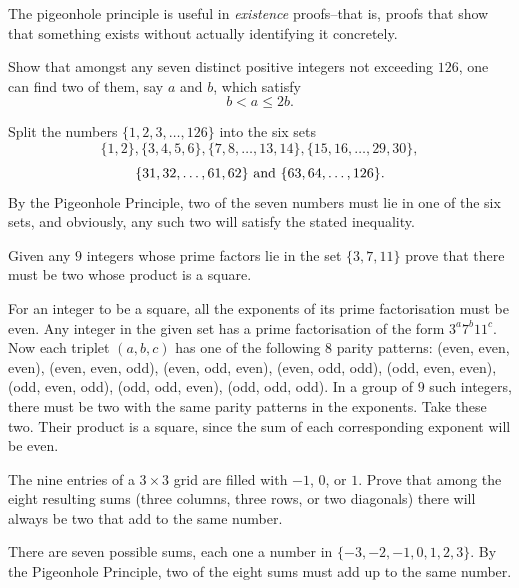 The pigeonhole principle is useful in {\em existence} proofs--that is, 
proofs that show that something exists without actually identifying it concretely.

\begin{exa} 
Show that amongst any seven distinct positive integers
not exceeding $126$, one can find two of them, say $a$ and $b$,
which satisfy $$ b < a \leq 2b.$$
\begin{sol} Split the
numbers $\{ 1, 2, 3, \ldots , 126 \}$ into the six sets $$\{ 1,
2\} , \{ 3, 4, 5, 6\} , \{ 7, 8, \ldots , 13, 14\} , \{ 15, 16,
\ldots , 29, 30\}, $$ $$\{ 31, 32, \ldots , 61, 62\} \ {\rm and} \
\{ 63, 64, \ldots ,126\} .$$By the Pigeonhole Principle, two of
the seven numbers must lie in one of the six sets, and obviously,
any such two will satisfy the stated inequality.
\end{sol}
\end{exa} 

\newpage


\begin{exa}
Given any $9$ integers whose prime factors lie in the set $\{3, 7,
11 \}$ prove that there must be two whose product is a square.
\begin{sol} 
For an integer to be a square, all the exponents of its
prime factorisation must be even. Any integer in the given set has a
prime factorisation of the form $3^a7^b11^c$. Now each triplet $(a,
b, c)$ has one of the following 8 parity patterns: (even, even,
even), (even, even, odd), (even, odd, even), (even, odd, odd), (odd,
even, even), (odd, even, odd), (odd, odd, even), (odd, odd, odd). In
a group of $9$ such integers, there must be two with the same parity
patterns in the exponents. Take these two. Their product is a
square, since the sum of each corresponding exponent will be even.
\end{sol}
\end{exa}

\begin{exer}
The nine entries of a $3\times 3$ grid are filled with $-1$, $0$, or
$1$. Prove that among the eight resulting sums (three columns, three
rows, or two diagonals) there will always be two that add to the
same number.

\noindent
\answerlinethree
\begin{answer}
There are seven possible sums, each one a number in
$\{-3,-2,-1,0,1,2,3\}$. By the Pigeonhole Principle, two of the
eight sums must add up to the same number.
\end{answer}
\end{exer}

